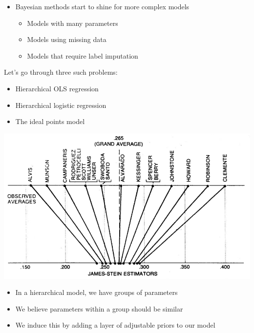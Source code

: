 \documentclass{beamer}
\begin{document}
\begin{frame}
  \begin{itemize}
    \item{Bayesian methods start to shine for more complex models}
    \begin{itemize}
      \item{Models with many parameters}
      \item{Models using missing data}
      \item{Models that require label imputation}
    \end{itemize}
  \end{itemize}
\end{frame}

\begin{frame}[fragile]
  Let's go through three such problems:
  \begin{itemize}
    \item{Hierarchical OLS regression}
    \item{Hierarchical logistic regression}
    \item{The ideal points model}
  \end{itemize}
\end{frame}

\frame
{
  \begin{center}
      \includegraphics[scale = 0.3]{efron.png}
  \end{center}
}

\begin{frame}[fragile]
  \begin{itemize}
    \item{In a hierarchical model, we have groups of parameters}
    \item{We believe parameters within a group should be similar}
    \item{We induce this by adding a layer of adjustable priors to our model}
  \end{itemize}
\end{frame}
\end{document}

